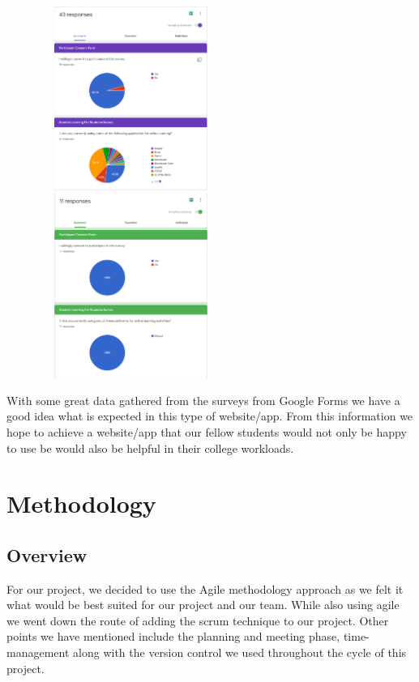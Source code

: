 \begin{figure}
    \centering
    \includegraphics[width=6cm,height = 6cm]{images/26.png}
    \includegraphics[width=6cm,height = 6cm]{images/27.png}
    \caption{ }
    \label{fig:my_label}
\end{figure}



With some great data gathered from the surveys from Google Forms\cite{ref26} we have a good idea what is expected in this type of website/app. From this information we hope to achieve a website/app that our fellow students would not only be happy to use be would also be helpful in their college workloads. 



\chapter{Methodology}
\section{Overview}
For our project, we decided to use the Agile methodology approach \cite{ref14} as we felt it what would be best suited for our project and our team. While also using agile we went down the route of adding the scrum\cite{ref15} technique to our project. Other points we have mentioned include the planning and meeting phase, time-management along with the version control we used throughout the cycle of this project.

